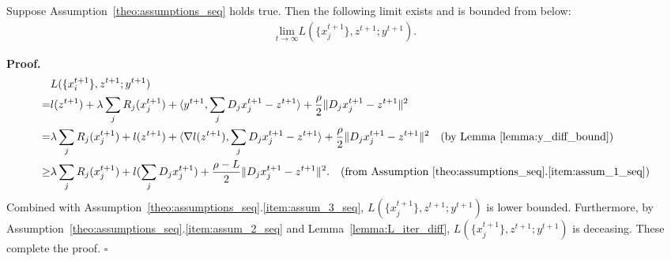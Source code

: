 \begin{lemma}\label{lemma:L_lower_bound}
    Suppose Assumption~\ref{theo:assumptions_seq} holds true. Then the following limit exists and is bounded from below: 
    \begin{align}
        \underset{t\rightarrow\infty}{\text{lim}} L(\{x_j^{t+1}\}, z^{t+1}; y^{t+1}). 
    \end{align}
\end{lemma}
{\bf Proof.} 
\begin{align}
    & L(\{x_i^{t+1}\}, z^{t+1}; y^{t+1} )\nonumber\\
    = & l(z^{t+1}) + \lambda\sum_j R_j(x_j^{t+1}) + \langle y^{t+1}, \sum_jD_j x_j^{t+1} - z^{t+1}\rangle + \frac{\rho}{2}\|D_j x_j^{t+1} - z^{t+1}\|^2\nonumber\\
    = &\lambda\sum_j R_j(x_j^{t+1}) + l(z^{t+1}) + \langle \nabla l(z^{t+1}), \sum_jD_j x_j^{t+1} - z^{t+1}\rangle + \frac{\rho}{2}\|D_j x_j^{t+1} - z^{t+1}\|^2\quad\text{(by Lemma~\ref{lemma:y_diff_bound})}\nonumber\\
    \ge & \lambda\sum_j R_j(x_j^{t+1}) + l(\sum_jD_j x_j^{t+1}) + \frac{\rho-L}{2}\|D_j x_j^{t+1} - z^{t+1}\|^2.\quad\text{(from Assumption~\ref{theo:assumptions_seq}.\ref{item:assum_1_seq})}
\end{align}
Combined with Assumption~\ref{theo:assumptions_seq}.\ref{item:assum_3_seq}, $L(\{x_j^{t+1}\}, z^{t+1}; y^{t+1})$ is lower bounded. Furthermore, by Assumption~\ref{theo:assumptions_seq}.\ref{item:assum_2_seq} and Lemma~\ref{lemma:L_iter_diff}, $L(\{x_j^{t+1}\}, z^{t+1}; y^{t+1})$ is deceasing. These complete the proof. \hfill$\square$

